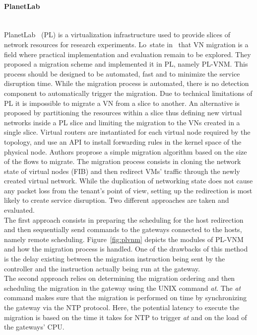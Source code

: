 \paragraph{PlanetLab}\textbf{\\} 
PlanetLab~\cite{planetlab} (PL) is a virtualization infrastructure used to provide slices of network resources for research experiments. Lo~\etal state in~\cite{Lo2014} that VN migration is a field where practical implementation and evaluation remain to be explored. They proposed a migration scheme and implemented it in PL, namely PL-VNM. This process should be designed to be automated, fast and to minimize the service disruption time. While the migration process is automated, there is no detection component to automatically trigger the migration. Due to technical limitations of PL it is impossible to migrate a VN from a slice to another. An alternative is proposed by partitioning the resources within a slice thus defining new virtual networks inside a PL slice and limiting the migration to the VNs created in a single slice. Virtual routers are instantiated for each virtual node required by the topology, and use an API to install forwarding rules in the kernel space of the physical node.
Authors proprose a simple migration algorithm based on the size of the flows to migrate.
The migration process consists in cloning the network state of virtual nodes (\ie FIB) and then  redirect VMs' traffic through the newly created virtual network.
While the duplication of networking state does not cause any packet loss from the tenant's point of view, setting up the redirection is most likely to create service disruption.
Two different approaches are taken and evaluated.\\
The first approach consists in preparing the scheduling for the host redirection and then sequentially send commands to the gateways connected to the hosts, namely remote scheduling.
Figure~\ref{fig:plvnm} depicts the modules of PL-VNM and how the migration process is handled.
One of the drawbacks of this method is the delay existing between the migration instruction being sent by the controller and the instruction actually being run at the gateway.\\
The second approach relies on determining the migration ordering and then scheduling the migration in the gateway using the UNIX command \textit{at}. The \textit{at} command makes sure that the migration is performed on time by synchronizing the gateway via the NTP protocol. Here, the potential latency to execute the migration is based on the time it takes for NTP to trigger \textit{at} and on the load of the gateways' CPU.
